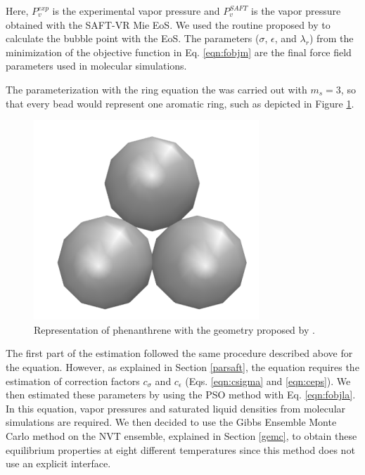 Here, $P_{v}^{exp}$ is the experimental vapor pressure and $P_{v}^{SAFT}$ is the vapor pressure obtained with the SAFT-VR Mie EoS. We used the routine proposed by   to calculate the bubble point with the EoS. The parameters ($\sigma$, $\epsilon $, and $\lambda _{r}$) from the minimization of the objective function in Eq. \eqref{eqn:fobjm} are the final force field parameters used in molecular simulations. 

The parameterization with the ring equation the  was carried out with $m_{s}=3$, so that every bead would represent one aromatic ring, such as depicted in Figure \ref{fig:fen3}.

\begin{figure}[th]
	\centering
	\includegraphics[width=0.15\linewidth]{Figures/fe3}
	\caption{Representation of phenanthrene with the geometry proposed by .}
	\label{fig:fen3}
\end{figure}

The first part of the estimation followed the same procedure described above for the  equation. However, as explained in Section \ref{parsaft}, the  equation requires the estimation of correction factors $c_{\sigma}$ and $c_{\epsilon}$ (Eqs. \eqref{eqn:csigma} and \eqref{eqn:ceps}). We then estimated these parameters by using the PSO method with Eq. \eqref{eqn:fobjla}. In this equation, vapor pressures and saturated liquid densities from molecular simulations are required. We then decided to use the Gibbs Ensemble Monte Carlo method on the NVT ensemble, explained in Section \ref{gemc}, to obtain these equilibrium properties at eight different temperatures since this method does not use an explicit interface.

